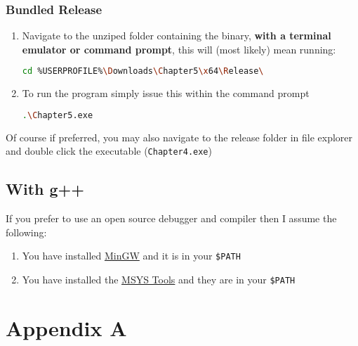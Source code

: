 \documentclass[a4paper,11pt]{article}
\begin{document}
      \subsubsection{Bundled Release}
        \begin{enumerate}
          \item Navigate to the unziped folder containing the binary, 
            \textbf{with a terminal emulator or command prompt}, this will
            (most likely) mean running:
            \begin{lstlisting}[language=bash]
              cd %USERPROFILE%\Downloads\Chapter5\x64\Release\
            \end{lstlisting}
          \item To run the program simply issue this within the command
            prompt
            \begin{lstlisting}[language=bash]
              .\Chapter5.exe
            \end{lstlisting}
        \end{enumerate}
        Of course if preferred, you may also navigate to the release folder in
          file explorer and double click the executable (\texttt{Chapter4.exe})
      \subsection{With g++}
        If you prefer to use an open source debugger and compiler then I assume
          the following:
          \begin{enumerate}
            \item You have installed \href{http://www.mingw.org/}{MinGW} and
              it is in your \texttt{\$PATH}
            \item You have installed the
            \href{http://www.mingw.org/wiki/MSYS}{MSYS Tools} and they are in
              your \texttt{\$PATH}
          \end{enumerate}


  \newpage
  \appendix

  \section{Appendix A}
\end{document}
